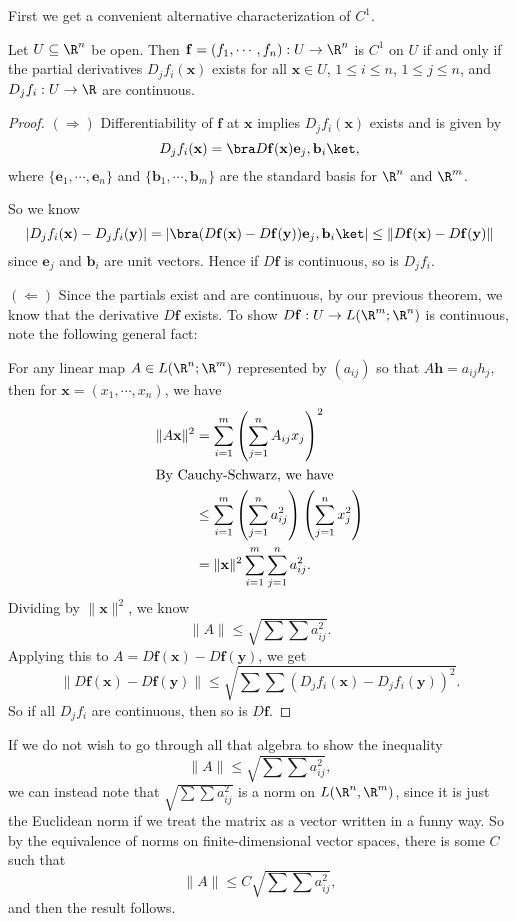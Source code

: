 \documentclass[a4paper]{article}
\begin{document}
First we get a convenient alternative characterization of $C^1$.
\begin{prop}
  Let $U \subseteq \R^n$ be open. Then $\mathbf{f} = (f_1, \cdots, f_n): U \to \R^n$ is $C^1$ on $U$ if and only if the partial derivatives $D_j f_i(\mathbf{x})$ exists for all $\mathbf{x} \in U$, $1 \leq i\leq n$, $1 \leq j \leq n$, and $D_j f_i: U \to \R$ are continuous.
\end{prop}

\begin{proof}
  $(\Rightarrow)$ Differentiability of $\mathbf{f}$ at $\mathbf{x}$ implies $D_j f_i(\mathbf{x})$ exists and is given by
  \[
    D_j f_i (\mathbf{x}) = \bra D\mathbf{f}(\mathbf{x}) \mathbf{e}_j, \mathbf{b}_i\ket,
  \]
  where $\{\mathbf{e}_1, \cdots, \mathbf{e}_n\}$ and $\{\mathbf{b}_1, \cdots, \mathbf{b}_m\}$ are the standard basis for $\R^n$ and $\R^m$.

  So we know
  \[
    |D_j f_i (\mathbf{x}) - D_j f_i (\mathbf{y})| = |\bra (D \mathbf{f}(\mathbf{x}) - D \mathbf{f}(\mathbf{y})) \mathbf{e}_j, \mathbf{b}_i \ket | \leq \|D \mathbf{f}(\mathbf{x}) - D \mathbf{f}(\mathbf{y})\|
  \]
  since $\mathbf{e}_j$ and $\mathbf{b}_i$ are unit vectors. Hence if $D\mathbf{f}$ is continuous, so is $D_j f_i$.

  $(\Leftarrow)$ Since the partials exist and are continuous, by our previous theorem, we know that the derivative $D \mathbf{f}$ exists. To show $D\mathbf{f}: U \to L(\R^m; \R^n)$ is continuous, note the following general fact:

  For any linear map $A \in L(\R^n; \R^m)$ represented by $(a_{ij})$ so that $A\mathbf{h} = a_{ij} h_j$, then for $\mathbf{x} = (x_1, \cdots, x_n)$, we have
  \begin{align*}
    \|A \mathbf{x}\|^2 &= \sum_{i = 1}^m \left(\sum_{j = 1}^n A_{ij} x_j\right)^2\\
    \intertext{By Cauchy-Schwarz, we have}
    &\leq \sum_{i = 1}^m \left(\sum_{j = 1}^n a_{ij}^2\right) \left(\sum_{j = 1}^n x_j^2\right)\\
    &= \|\mathbf{x}\|^2 \sum_{i = 1}^m \sum_{j = 1}^n a_{ij}^2.
  \end{align*}
  Dividing by $\|\mathbf{x}\|^2$, we know
  \[
    \|A\| \leq \sqrt{\sum \sum a_{ij}^2}.
  \]
  Applying this to $A = D \mathbf{f}(\mathbf{x}) - D \mathbf{f}(\mathbf{y})$, we get
  \[
    \|D \mathbf{f}(\mathbf{x}) - D \mathbf{f}(\mathbf{y})\| \leq \sqrt{\sum\sum (D_j f_i(\mathbf{x}) - D_j f_i (\mathbf{y}))^2}.
  \]
  So if all $D_j f_i$ are continuous, then so is $D \mathbf{f}$.
\end{proof}
If we do not wish to go through all that algebra to show the inequality
\[
  \|A\| \leq \sqrt{\sum \sum a_{ij}^2},
\]
we can instead note that $\sqrt{\sum \sum a_{ij}^2}$ is a norm on $L(\R^n, \R^m)$, since it is just the Euclidean norm if we treat the matrix as a vector written in a funny way. So by the equivalence of norms on finite-dimensional vector spaces, there is some $C$ such that
\[
  \|A\| \leq C\sqrt{\sum \sum a_{ij}^2},
\]
and then the result follows.
\end{document}
